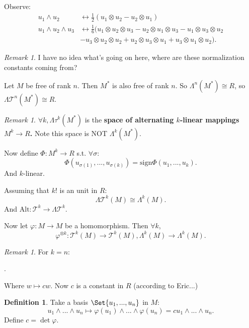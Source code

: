 \documentclass[9pt,reqno,twoside]{amsbook}
\theoremstyle{plain}
\numberwithin{section}{chapter}
\numberwithin{equation}{chapter}
\theoremstyle{definition}
\newtheorem{Def}[theorem]{Definition}
\theoremstyle{remark}
\newtheorem{rem}[theorem]{Remark}
\theoremstyle{plain}
\newcommand{\bb}{\vspace{3mm}}
\newcommand{\mc}{\mathcal}
\newcommand{\bee}{\begin{equation}\begin{aligned}}
\newcommand{\eee}{\end{aligned}\end{equation}}
\newcommand{\fracc}{\frac}
\newcommand{\tens}{\otimes}
\newcommand{\lpar}{\left(}
\newcommand{\rpar}{\right)}
\newcommand{\Tau}{\mc{T}}
\renewcommand{\tt}{\text}
\renewcommand{\phi}{\varphi}
\begin{document}
Observe: 
\bee
u_1 \wedge u_2 &\leftrightarrow \fracc{1}{2} \lpar u_1 \tens u_2 - u_2 \tens u_1\rpar\\
u_1 \wedge u_2 \wedge u_3 &\leftrightarrow \fracc{1}{6}\bigg( u_1 \tens u_2 \tens u_3 - u_2 \tens u_1 \tens u_3 - u_1 \tens u_3 \tens u_2\\
&- u_3 \tens u_2 \tens u_2 + u_2 \tens u_3 \tens u_1 + u_3 \tens u_1 \tens u_2\bigg).
\eee

\begin{rem}
I have no idea what's going on here, where are these normalization constants coming from?
\end{rem}

\bb\bb

Let $M$ be free of rank $n$. Then $M^*$ is also free of rank $n$. So $\Lambda^n(M^*) \cong R$, so $\Lambda \Tau^n(M^*) \cong R$. 

\begin{rem}
$\forall k, \Lambda\tau^k(M^*)$ is the \textbf{space of alternating $k$-linear mappings $M^k \to R$. } Note this space is NOT $\Lambda^k(M^*)$. 
\end{rem}

Now define $\Phi:M^k \to R$ s.t. $\forall \sigma$:
$$
\Phi(u_{\sigma(1)},...,u_{\sigma(k)}) = \tt{sign}\Phi(u_1,...,u_k).
$$
And $k$-linear. 

\bb

Assuming that $k!$ is an unit in $R$:
$$
\Lambda\Tau^k(M) \cong \Lambda^k(M).
$$
And $\tt{Alt}:\Tau^k \to \Lambda\Tau^k$. 

\bb\bb
Now let $\phi: M \to M$ be a homomorphism. Then $\forall k$, 
$$
\phi^{\tens k}: \Tau^k(M) \to \Tau^k(M), \Lambda^k(M) \to \Lambda^k(M).
$$

\begin{rem}
For $k = n$:
\begin{center}
.
\end{center}


Where $w \mapsto cw$. Now $c$ is a constant in $R$ (according to Eric...)
\end{rem}

\begin{Def}
Take a basis $\Set{u_1,...,u_n}$ in $M$:
$$
u_1 \wedge ... \wedge u_n \mapsto \phi(u_1) \wedge ... \wedge \phi(u_n) = cu_1 \wedge ... \wedge u_n.
$$
Define $c =\det\phi$. 
\end{Def}
\end{document}
